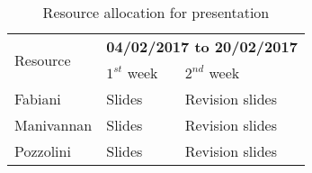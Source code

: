 \begin{table}[H]
	\centering
	\begin{tabular}{|l|p{3cm}|p{3cm}|}
		\hline
		\multirow{2}{*}{Resource} & \multicolumn{2}{c|}{\textbf{04/02/2017 to 20/02/2017}} \\
		\cline{2-3}
		& $1^{st}$ week & $2^{nd}$ week \\
		\hline
		Fabiani & Slides & Revision slides \\
		Manivannan & Slides & Revision slides \\
		Pozzolini & Slides & Revision slides \\
		\hline
	\end{tabular}
	\caption{Resource allocation for presentation}
	\label{tab:presentation-alloc}
\end{table}